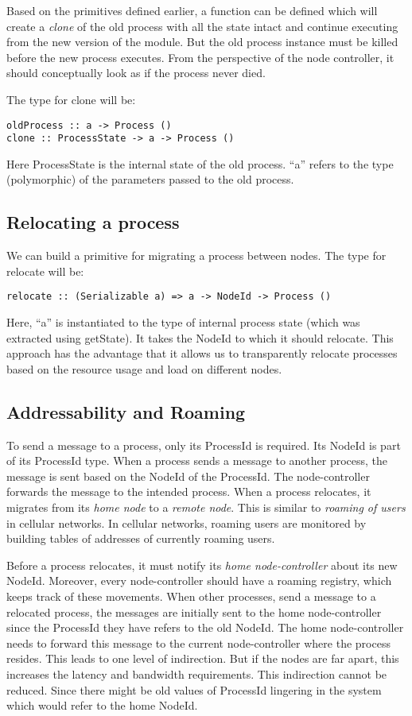 Based on the primitives defined earlier, a function can be defined
which will create a \emph{clone} of the old process with all the state
intact and continue executing from the new version of the module. But
the old process instance must be killed before the new process
executes. From the perspective of the node controller, it should
conceptually look as if the process never died.

The type for clone will be:
\begin{verbatim}
oldProcess :: a -> Process ()
clone :: ProcessState -> a -> Process ()
\end{verbatim}
Here ProcessState is the internal state of the old process. ``a''
refers to the type (polymorphic) of the parameters passed to the old
process.

\subsection{Relocating a process}

We can build a primitive for migrating a process between nodes.
The type for relocate will be:
\begin{verbatim}
relocate :: (Serializable a) => a -> NodeId -> Process ()
\end{verbatim}

Here, ``a'' is instantiated to the type of internal process state
(which was extracted using getState). It takes the NodeId to which it
should relocate.  This approach has the advantage that it allows us to
transparently relocate processes based on the resource usage and load
on different nodes.

\subsection{Addressability and Roaming}

To send a message to a process, only its ProcessId is required. Its
NodeId is part of its ProcessId type. When a process sends a message
to another process, the message is sent based on the NodeId
of the ProcessId. The node-controller forwards the message to the
intended process. When a process relocates, it migrates from its
\emph{home node} to a \emph{remote node}. This is similar to
\emph{roaming of users} in cellular networks. In cellular networks,
roaming users are monitored by building tables of addresses of
currently roaming users.

Before a process relocates, it must notify its \emph{home
  node-controller} about its new NodeId. Moreover, every
node-controller should have a roaming registry, which keeps track of
these movements. When other processes, send a message to a relocated
process, the messages are initially sent to the home node-controller
since the ProcessId they have refers to the old NodeId.  The home
node-controller needs to forward this message to the current
node-controller where the process resides. This leads to one level of
indirection.  But if the nodes are far apart, this increases the
latency and bandwidth requirements. This indirection cannot be
reduced. Since there might be old values of ProcessId lingering in the
system which would refer to the home NodeId.

